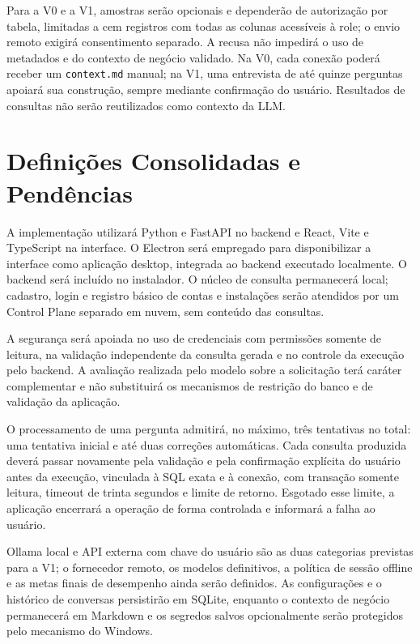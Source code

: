 Para a V0 e a V1, amostras serão opcionais e dependerão de autorização por tabela, limitadas a cem registros com todas as colunas acessíveis à role; o envio remoto exigirá consentimento separado. A recusa não impedirá o uso de metadados e do contexto de negócio validado. Na V0, cada conexão poderá receber um \texttt{context.md} manual; na V1, uma entrevista de até quinze perguntas apoiará sua construção, sempre mediante confirmação do usuário. Resultados de consultas não serão reutilizados como contexto da LLM.

\section{Definições Consolidadas e Pendências}

A implementação utilizará Python e FastAPI no backend e React, Vite e TypeScript na interface. O Electron será empregado para disponibilizar a interface como aplicação desktop, integrada ao backend executado localmente. O backend será incluído no instalador. O núcleo de consulta permanecerá local; cadastro, login e registro básico de contas e instalações serão atendidos por um Control Plane separado em nuvem, sem conteúdo das consultas.

A segurança será apoiada no uso de credenciais com permissões somente de leitura, na validação independente da consulta gerada e no controle da execução pelo backend. A avaliação realizada pelo modelo sobre a solicitação terá caráter complementar e não substituirá os mecanismos de restrição do banco e de validação da aplicação.

O processamento de uma pergunta admitirá, no máximo, três tentativas no total: uma tentativa inicial e até duas correções automáticas. Cada consulta produzida deverá passar novamente pela validação e pela confirmação explícita do usuário antes da execução, vinculada à SQL exata e à conexão, com transação somente leitura, timeout de trinta segundos e limite de retorno. Esgotado esse limite, a aplicação encerrará a operação de forma controlada e informará a falha ao usuário.

Ollama local e API externa com chave do usuário são as duas categorias previstas para a V1; o fornecedor remoto, os modelos definitivos, a política de sessão offline e as metas finais de desempenho ainda serão definidos. As configurações e o histórico de conversas persistirão em SQLite, enquanto o contexto de negócio permanecerá em Markdown e os segredos salvos opcionalmente serão protegidos pelo mecanismo do Windows.

